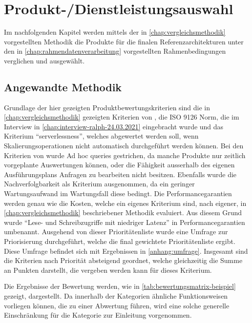 \chapter{Produkt-/Dienstleistungsauswahl}
Im nachfolgenden Kapitel werden mittels der in \autoref{chap:vergleichsmethodik} vorgestellten Methodik die Produkte für die finalen Referenzarchitekturen unter den in \autoref{chap:rahmendatenverarbeitung} vorgestellten Rahmenbedingungen verglichen und ausgewählt.

\section{Angewandte Methodik}

Grundlage der hier gezeigten Produktbewertungskriterien sind die in \autoref{chap:vergleichsmethodik} gezeigten Kriterien von \citeauthor{Marz.2015}, die ISO 9126 Norm, die im Interview in \autoref{chap:interview-ralph-24.03.2021} eingebracht wurde und das Kriterium \enquote{serverlessness}, welches abgewertet werden soll, wenn Skalierungsoperationen nicht automatisch durchgeführt werden können. Bei den Kriterien von \citeauthor{Marz.2015} wurde Ad hoc queries gestrichen, da manche Produkte nur zeitlich vorgeplante Auswertungen können, oder die Fähigkeit ausserhalb des eigenen Ausführungsplans Anfragen zu bearbeiten nicht besitzen. Ebenfalls wurde die Nachverfolgbarkeit als Kriterium ausgenommen, da ein geringer Wartungsaufwand im Wartungsfall diese bedingt. Die Performancegarantien werden genau wie die Kosten, welche ein eigenes Kriterium sind, nach eigener, in \autoref{chap:vergleichsmethodik} beschriebener Methodik evaluiert. Aus diesem Grund wurde \enquote{Lese- und Schreibzugriffe mit niedriger Latenz} in Performancegarantien umbenannt. Ausgehend von dieser Prioritätenliste wurde eine Umfrage zur Priorisierung durchgeführt, welche die final gewichtete Prioritätenliste ergibt. Diese Umfrage befindet sich mit Ergebnissen in \autoref{anhang:umfrage}. Insgesamt sind die Kriterien nach Priorität absteigend geordnet, welche gleichzeitig die Summe an Punkten darstellt, die vergeben werden kann für dieses Kriterium.



Die Ergebnisse der Bewertung werden, wie in \autoref{tab:bewertungsmatrix-beispiel} gezeigt, dargestellt.  Da innerhalb der Kategorien ähnliche Funktionsweisen vorliegen können, die zu einer Abwertung führen, wird eine solche generelle Einschränkung für die Kategorie zur Einleitung vorgenommen.

